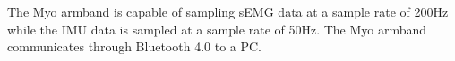 The Myo armband is capable of sampling sEMG data at a sample rate of 200Hz while the IMU data is sampled at a sample rate of  50Hz. The Myo armband communicates through Bluetooth 4.0 to a PC. 







